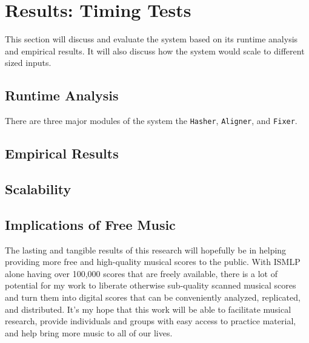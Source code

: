 \section{Results: Timing Tests} \label{timing}
This section will discuss and evaluate the system based on its runtime analysis and empirical results. It will also discuss how the system would scale to different sized inputs. 

\subsection{Runtime Analysis}
There are three major modules of the system the \texttt{Hasher}, \texttt{Aligner}, and \texttt{Fixer}.	
\subsection{Empirical Results}
\subsection{Scalability}


\subsection{Implications of Free Music}
The lasting and tangible results of this research will hopefully be in helping providing more free and high-quality musical scores to the public. With ISMLP alone having over 100,000 scores that are freely available, there is a lot of potential for my work to liberate otherwise sub-quality scanned musical scores and turn them into digital scores that can be conveniently analyzed, replicated, and distributed. It's my hope that this work will be able to facilitate musical research, provide individuals and groups with easy access to practice material, and help bring more music to all of our lives.
